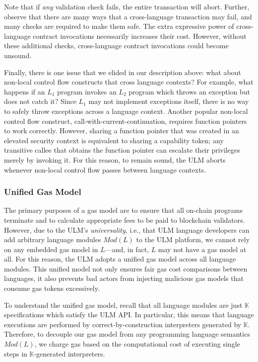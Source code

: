 \documentclass{article}
\newcommand{\ulm}{{ULM}}
\newcommand{\K}{\ensuremath{\mathbb{K}}}
\begin{document}
Note that if \emph{any} validation check fails, the entire transaction will abort.
Further, observe that there are many ways that a cross-language transaction may fail, and many checks are required to make them safe.
The extra expressive power of cross-language contract invocations necessarily increases their cost.
However, without these additional checks, cross-language contract invocations could become unsound.

Finally, there is one issue that we elided in our description above: what about non-local control flow constructs that cross language contexts?
For example, what happens if an $L_1$ program invokes an $L_2$ program which throws an exception but does not catch it?
Since $L_1$ may not implement exceptions itself, there is no way to safely throw exceptions across a language context.
Another popular non-local control flow construct, call-with-current-continuation, requires function pointers to work correctly.
However, sharing a function pointer that was created in an elevated security context is equivalent to sharing a capability token; any transitive callee that obtains the function pointer can escalate their privileges merely by invoking it.
For this reason, to remain sound, the \ulm{} aborts whenever non-local control flow passes between language contexts.

\subsubsection{Unified Gas Model}
\label{gas}


The primary purposes of a gas model are to ensure that all on-chain programs terminate and to calculate appropriate fees to be paid to blockchain validators.
However, due to the \ulm{}'s \emph{universality}, i.e., that \ulm{} language developers can add arbitrary language modules $Mod(L)$ to the \ulm{} platform, we cannot rely on any embedded gas model in $L$---and, in fact, $L$ may not have a gas model at all.
For this reason, the \ulm{} adopts a unified gas model across all language modules.
This unified model not only ensures fair gas cost comparisons between languages, it also prevents bad actors from injecting malicious gas models that consume gas tokens excessively.

To understand the unified gas model, recall that all language modules are just \K{} specifications which satisfy the \ulm{} API.
In particular, this means that language executions are performed by correct-by-construction interpreters generated by \K{}.
Therefore, to decouple our gas model from any programming language semantics $Mod(L)$, we charge gas based on the computational cost of executing single steps in \K{}-generated interpreters.
\end{document}
